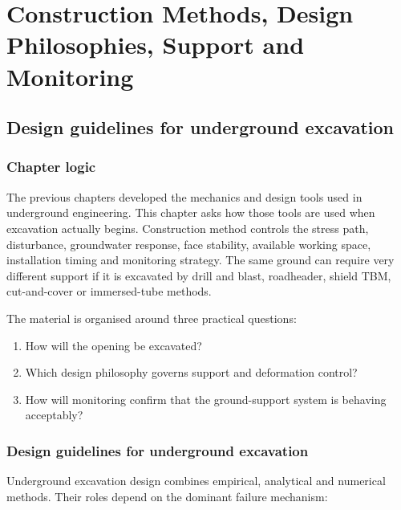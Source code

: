 %
\chapter{Construction Methods, Design Philosophies, Support and Monitoring}
\label{ch:construction}


\section{Design guidelines for underground excavation}
\label{sec:design-guidelines-for-underground-excavation}

\subsection{Chapter logic}
The previous chapters developed the mechanics and design tools used in underground engineering. This chapter asks how those tools are used when excavation actually begins. Construction method controls the stress path, disturbance, groundwater response, face stability, available working space, installation timing and monitoring strategy. The same ground can require very different support if it is excavated by drill and blast, roadheader, shield TBM, cut-and-cover or immersed-tube methods.

The material is organised around three practical questions:
\begin{enumerate}
 \item How will the opening be excavated?
 \item Which design philosophy governs support and deformation control?
 \item How will monitoring confirm that the ground-support system is behaving acceptably?
\end{enumerate}

\subsection{Design guidelines for underground excavation}
\label{sec:design-guidelines}
Underground excavation design combines empirical, analytical and numerical methods. Their roles depend on the dominant failure mechanism:

